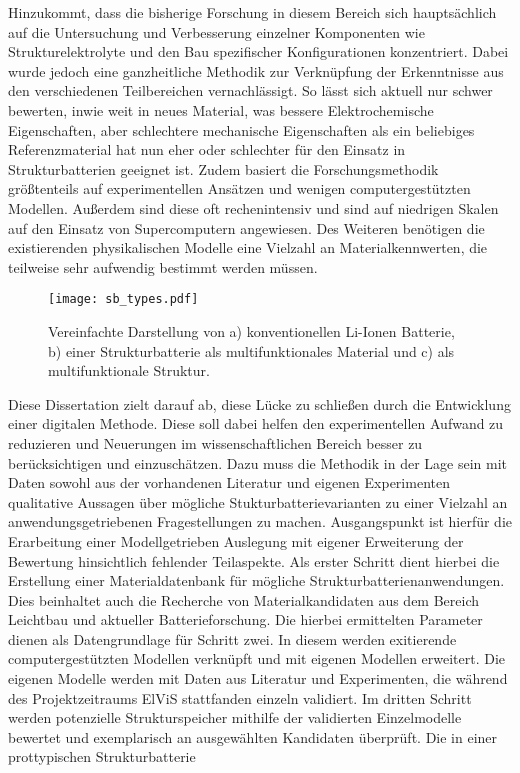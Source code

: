 Hinzukommt, dass die bisherige Forschung in diesem Bereich sich hauptsächlich auf die Untersuchung und Verbesserung einzelner Komponenten wie Strukturelektrolyte und den Bau spezifischer Konfigurationen konzentriert. Dabei wurde jedoch eine ganzheitliche Methodik zur Verknüpfung der Erkenntnisse aus den verschiedenen Teilbereichen vernachlässigt. So lässt sich aktuell nur schwer bewerten, inwie weit in neues Material, was bessere Elektrochemische Eigenschaften, aber schlechtere mechanische Eigenschaften als ein beliebiges Referenzmaterial hat nun eher oder schlechter für den Einsatz in Strukturbatterien geeignet ist. Zudem basiert die Forschungsmethodik größtenteils auf experimentellen Ansätzen und wenigen computergestützten Modellen. Außerdem sind diese oft rechenintensiv und sind auf niedrigen Skalen auf den Einsatz von Supercomputern angewiesen. Des Weiteren benötigen die existierenden physikalischen Modelle eine Vielzahl an Materialkennwerten, die teilweise sehr aufwendig bestimmt werden müssen.

\begin{figure}[h]
        \center
	\texttt{[image: sb\_types.pdf]}
		\caption{\label{fig:sb_types}Vereinfachte Darstellung von a) konventionellen Li-Ionen Batterie, b) einer Strukturbatterie als multifunktionales Material und c) als multifunktionale Struktur.}
\end{figure}

Diese Dissertation zielt darauf ab, diese Lücke zu schließen durch die Entwicklung einer digitalen Methode. Diese soll dabei helfen den experimentellen Aufwand zu reduzieren und Neuerungen im wissenschaftlichen Bereich besser zu berücksichtigen und einzuschätzen. Dazu muss die Methodik in der Lage sein mit Daten sowohl aus der vorhandenen Literatur und eigenen Experimenten qualitative Aussagen über mögliche Stukturbatterievarianten zu einer Vielzahl an anwendungsgetriebenen Fragestellungen zu machen. 
Ausgangspunkt ist hierfür die Erarbeitung einer Modellgetrieben Auslegung mit eigener Erweiterung der Bewertung hinsichtlich fehlender Teilaspekte. Als erster Schritt dient hierbei die Erstellung einer Materialdatenbank für mögliche Strukturbatterienanwendungen. Dies beinhaltet auch die Recherche von Materialkandidaten aus dem Bereich Leichtbau und aktueller Batterieforschung. Die hierbei ermittelten Parameter dienen als Datengrundlage für Schritt zwei. In diesem werden exitierende computergestützten Modellen verknüpft und mit eigenen Modellen erweitert. Die eigenen Modelle werden mit Daten aus Literatur und Experimenten, die während des Projektzeitraums ElViS stattfanden einzeln validiert. Im dritten Schritt werden potenzielle Strukturspeicher mithilfe der validierten Einzelmodelle bewertet und exemplarisch an ausgewählten Kandidaten überprüft. Die  in einer prottypischen Strukturbatterie 

